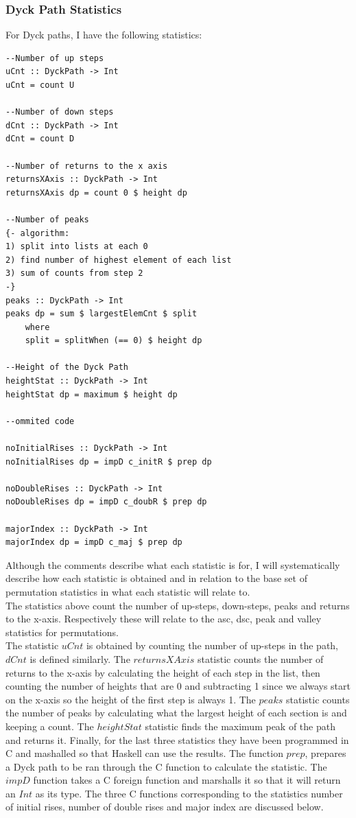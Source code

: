 \documentclass[12pt]{article}
\begin{document}
\subsubsection{Dyck Path Statistics}
For Dyck paths, I have the following statistics:
\begin{lstlisting}
--Number of up steps
uCnt :: DyckPath -> Int
uCnt = count U 

--Number of down steps
dCnt :: DyckPath -> Int
dCnt = count D 

--Number of returns to the x axis
returnsXAxis :: DyckPath -> Int
returnsXAxis dp = count 0 $ height dp

--Number of peaks
{- algorithm:
1) split into lists at each 0
2) find number of highest element of each list
3) sum of counts from step 2
-}
peaks :: DyckPath -> Int
peaks dp = sum $ largestElemCnt $ split
	where
	split = splitWhen (== 0) $ height dp

--Height of the Dyck Path
heightStat :: DyckPath -> Int 
heightStat dp = maximum $ height dp

--ommited code

noInitialRises :: DyckPath -> Int
noInitialRises dp = impD c_initR $ prep dp

noDoubleRises :: DyckPath -> Int
noDoubleRises dp = impD c_doubR $ prep dp

majorIndex :: DyckPath -> Int
majorIndex dp = impD c_maj $ prep dp
\end{lstlisting}
Although the comments describe what each statistic is for, I will systematically describe how each statistic is obtained and in relation to the base set of permutation statistics in \cite{Clae01} what each statistic will relate to.\\
The statistics above count the number of up-steps, down-steps, peaks and returns to the x-axis. Respectively these will relate to the asc, dsc, peak and valley statistics for permutations.\\
The statistic $uCnt$ is obtained by counting the number of up-steps in the path, $dCnt$ is defined similarly. The $returnsXAxis$ statistic counts the number of returns to the x-axis by calculating the height of each step in the list, then counting the number of heights that are 0 and subtracting 1 since we always start on the x-axis so the height of the first step is always 1. The $peaks$ statistic counts the number of peaks by calculating what the largest height of each section is and keeping a count. The $heightStat$ statistic finds the maximum peak of the path and returns it. Finally, for the last three statistics they have been programmed in C and mashalled so that Haskell can use the results. The function $prep$, prepares a Dyck path to be ran through the C function to calculate the statistic. The $impD$ function takes a C foreign function and marshalls it so that it will return an $Int$ as its type. The three C functions corresponding to the statistics number of initial rises, number of double rises and major index are discussed below.\\
\end{document}
